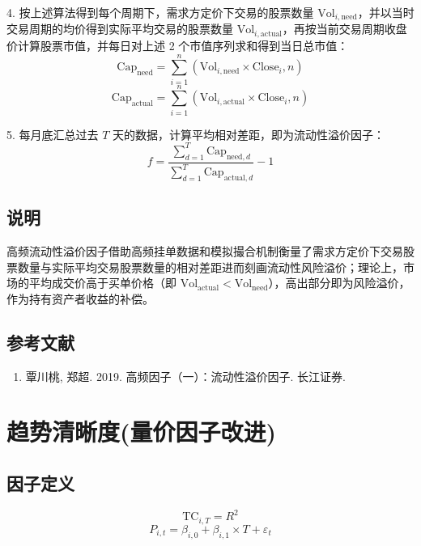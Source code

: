 \documentclass{article}
\begin{document}
4. 按上述算法得到每个周期下，需求方定价下交易的股票数量 \( \mathrm{Vol}_{i,\mathrm{need}} \)，并以当时交易周期的均价得到实际平均交易的股票数量 \( \mathrm{Vol}_{i,\mathrm{actual}} \)，再按当前交易周期收盘价计算股票市值，并每日对上述 2 个市值序列求和得到当日总市值：
\begin{equation}
    \mathrm{Cap}_{\mathrm{need}} = \sum_{i=1}^{n} (\mathrm{Vol}_{i,\mathrm{need}} \times \mathrm{Close}_{i},n)
\end{equation}
\begin{equation}
    \mathrm{Cap}_{\mathrm{actual}} = \sum_{i=1}^{n} (\mathrm{Vol}_{i,\mathrm{actual}} \times \mathrm{Close}_i,n)
\end{equation}

5. 每月底汇总过去 \( T \) 天的数据，计算平均相对差距，即为流动性溢价因子：
\begin{equation}
    f = \frac{\sum_{d=1}^{T} \mathrm{Cap}_{\mathrm{need},d}}{\sum_{d=1}^{T} \mathrm{Cap}_{\mathrm{actual},d}} - 1
\end{equation}

\subsection{说明}
高频流动性溢价因子借助高频挂单数据和模拟撮合机制衡量了需求方定价下交易股票数量与实际平均交易股票数量的相对差距进而刻画流动性风险溢价；理论上，市场的平均成交价高于买单价格（即 \( \mathrm{Vol}_{\mathrm{actual}} < \mathrm{Vol}_{\mathrm{need}} \)），高出部分即为风险溢价，作为持有资产者收益的补偿。

\subsection{参考文献}
\begin{enumerate}
    \item 覃川桃, 郑超. 2019. 高频因子（一）：流动性溢价因子. 长江证券.
\end{enumerate}

\section{趋势清晰度(量价因子改进)}

\subsection{因子定义}
\begin{equation}
    \mathrm{TC}_{i,T} = R^2
\end{equation}
\begin{equation}
    P_{i,t} = \beta_{i,0} + \beta_{i,1} \times T + \varepsilon_t
\end{equation}
\end{document}

